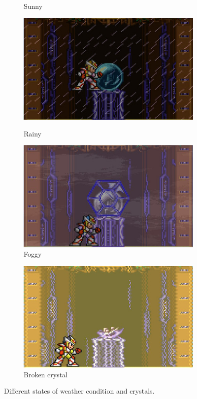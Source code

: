 \begin{figure}[htp]
\begin{subfigure}{0.3\linewidth}
		\caption{Sunny}
	\end{subfigure}
	\begin{subfigure}{0.3\linewidth}	
		\centering
		\includegraphics[width=\linewidth]{figures/X2/Wire_sponge/sponge_crystal_rain.jpg}\\
		\caption{Rainy}
	\end{subfigure}
	\begin{subfigure}{0.3\linewidth}
		\centering
		\includegraphics[width=\linewidth]{figures/X2/Wire_sponge/sponge_crystal_fog.jpg}
		\caption{Foggy}	
	\end{subfigure}
	\begin{subfigure}{0.3\linewidth}
		\centering
		\includegraphics[width=\linewidth]{figures/X2/Wire_sponge/sponge_crystal_broken.jpg}
		\caption{Broken crystal}	
	\end{subfigure}
	\caption{Different states of weather condition and crystals.}
\end{figure}

